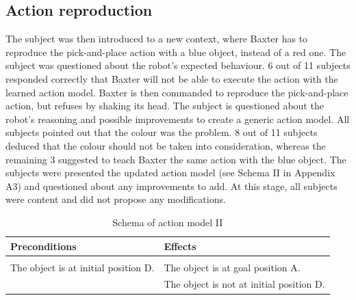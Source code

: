 \subsection{Action reproduction}
The subject was then introduced to a new context, where Baxter has to reproduce the pick-and-place action with a blue object, instead of a red one. The subject was questioned about the robot's expected behaviour. 6 out of 11 subjects responded correctly that Baxter will not be able to execute the action with the learned action model.
Baxter is then commanded to reproduce the pick-and-place action, but refuses by shaking its head. The subject is questioned about the robot's reasoning and possible improvements to create a generic action model. All subjects pointed out that the colour was the problem. 8 out of 11 subjects deduced that the colour should not be taken into consideration, whereas the remaining 3 suggested to teach Baxter the same action with the blue object. The subjects were presented the updated action model (see Schema II in Appendix A3) and questioned about any improvements to add. At this stage, all subjects were content and did not propose any modifications.
\begin{table}[h]
\begin{center}
\begin{tabular}{l|l}
Preconditions & Effects\\ \hline
 & \\
The object is at initial position D. & The object is at goal position A.\\
 & The object is not at initial position D.
\end{tabular}
\end{center}
\label{tab:schema2}
\caption{Schema of action model II}
\end{table}

